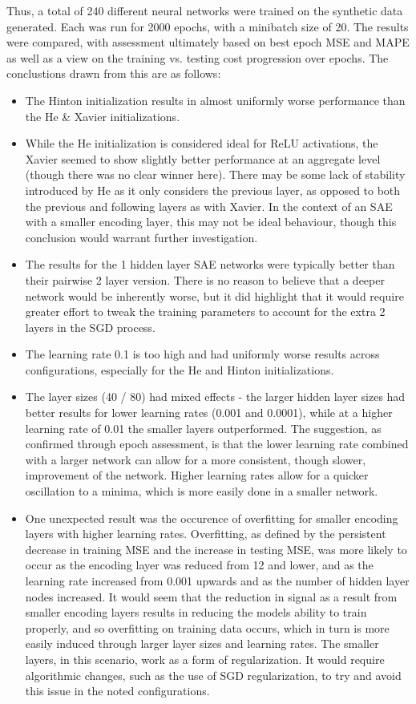 \documentclass[a4paper,latin]{paper}
\begin{document}
Thus, a total of 240 different neural networks were trained on the synthetic data generated. Each was run for 2000 epochs, with a minibatch size of 20. The results were compared, with assessment ultimately based on best epoch MSE and MAPE as well as a view on the training vs. testing cost progression over epochs. The conclustions drawn from this are as follows:

\begin{itemize}
	\item The Hinton initialization results in almost uniformly worse performance than the He \& Xavier initializations. 
	\item While the He initialization is considered ideal for ReLU activations, the Xavier seemed to show slightly better performance at an aggregate level (though there was no clear winner here). There may be some lack of stability introduced by He as it only considers the previous layer, as opposed to both the previous and following layers as with Xavier. In the context of an SAE with a smaller encoding layer, this may not be ideal behaviour, though this conclusion would warrant further investigation.
	\item The results for the 1 hidden layer SAE networks were typically better than their pairwise 2 layer version. There is no reason to believe that a deeper network would be inherently worse, but it did highlight that it would require greater effort to tweak the training parameters to account for the extra 2 layers in the SGD process.
	\item The learning rate 0.1 is too high and had uniformly worse results across configurations, especially for the He and Hinton initializations.
	\item The layer sizes (40 / 80) had mixed effects - the larger hidden layer sizes had better results for lower learning rates (0.001 and 0.0001), while at a higher learning rate of 0.01 the smaller layers outperformed. The suggestion, as confirmed through epoch assessment, is that the lower learning rate combined with a larger network can allow for a more consistent, though slower, improvement of the network. Higher learning rates allow for a quicker oscillation to a minima, which is more easily done in a smaller network.
	\item One unexpected result was the occurence of overfitting for smaller encoding layers with higher learning rates. Overfitting, as defined by the persistent decrease in training MSE and the increase in testing MSE, was more likely to occur as the encoding layer was reduced from 12 and lower, and as the learning rate increased from 0.001 upwards and as the number of hidden layer nodes increased. It would seem that the reduction in signal as a result from smaller encoding layers results in reducing the models ability to train properly, and so overfitting on training data occurs, which in turn is more easily induced through larger layer sizes and learning rates. The smaller layers, in this scenario, work as a form of regularization. It would require algorithmic changes, such as the use of SGD regularization, to try and avoid this issue in the noted configurations.
\end{itemize}
\end{document}
